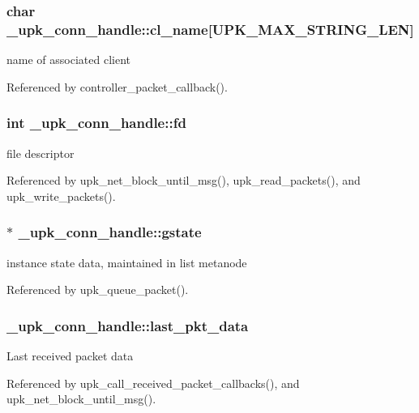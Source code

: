\subsubsection[{cl\_\-name}]{\setlength{\rightskip}{0pt plus 5cm}char {\bf \_\-upk\_\-conn\_\-handle::cl\_\-name}[UPK\_\-MAX\_\-STRING\_\-LEN]}\label{struct__upk__conn__handle_abf3ba969bba3bb135c0c46415f7da5de}
name of associated client 

Referenced by controller\_\-packet\_\-callback().

\subsubsection[{fd}]{\setlength{\rightskip}{0pt plus 5cm}int {\bf \_\-upk\_\-conn\_\-handle::fd}}\label{struct__upk__conn__handle_ac03668d85ace564c00ace2a0dafa5a99}
file descriptor 

Referenced by upk\_\-net\_\-block\_\-until\_\-msg(), upk\_\-read\_\-packets(), and upk\_\-write\_\-packets().

\subsubsection[{gstate}]{$\ast$ {\bf \_\-upk\_\-conn\_\-handle::gstate}}\label{struct__upk__conn__handle_a9e1447ed2101ef8bf54d3bc349d4c3c5}
instance state data, maintained in list metanode 

Referenced by upk\_\-queue\_\-packet().

\subsubsection[{last\_\-pkt\_\-data}]{ {\bf \_\-upk\_\-conn\_\-handle::last\_\-pkt\_\-data}}\label{struct__upk__conn__handle_a710dc65b81c7f60848d8b820fa74a827}
Last received packet data 

Referenced by upk\_\-call\_\-received\_\-packet\_\-callbacks(), and upk\_\-net\_\-block\_\-until\_\-msg().

